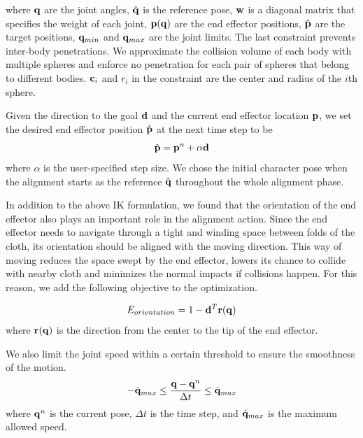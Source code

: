 where $\mathbf{q}$ are the joint angles, $\hat{\mathbf{q}}$ is the reference pose, $\mathbf{w}$ is a diagonal matrix that specifies the weight of each joint, $\mathbf{p}(\mathbf{q})$ are the end effector positions, $\hat{\mathbf{p}}$ are the target positions, $\mathbf{q}_{min}$ and $\mathbf{q}_{max}$ are the joint limits. The last constraint prevents inter-body penetrations. We approximate the collision volume of each body with multiple spheres and enforce no penetration for each pair of spheres that belong to different bodies. $\mathbf{c}_i$ and $r_i$ in the constraint are the center and radius of the $i$th sphere.

Given the direction to the goal $\mathbf{d}$ and the current end effector location $\mathbf{p}$, we set the desired end effector position $\hat{\mathbf{p}}$ at the next time step to be
\begin{equation}
  \hat{\mathbf{p}} = \mathbf{p}^n+\alpha\mathbf{d}
  \label{eq:target}
\end{equation}
where $\alpha$ is the user-specified step size.  We chose the initial character pose when the alignment starts as the reference $\hat{\mathbf{q}}$ throughout the whole alignment phase.

In addition to the above IK formulation, we found that the orientation of the end effector also plays an important role in the alignment action. Since the end effector needs to navigate through a tight and winding space between folds of the cloth, its orientation should be aligned with the moving direction. This way of moving reduces the space swept by the end effector, lowers its chance to collide with nearby cloth and minimizes the normal impacts if collisions happen. For this reason, we add the following objective to the optimization.

\begin{equation}
  E_{orientation} = 1-\mathbf{d}^T\mathbf{r(q})
  \label{eq:orientation}
\end{equation}
where $\mathbf{r(q)}$ is the direction from the center to the tip of the end effector.

We also limit the joint speed within a certain threshold to ensure the smoothness of the motion.
\begin{equation}
  -\dot{\mathbf{q}}_{max} \leq \frac{\mathbf{q} - \mathbf{q}^n}{\Delta t} \leq \dot{\mathbf{q}}_{max}
  \label{eq:speed}
\end{equation}
where $\mathbf{q}^n$ is the current pose, $\Delta t$ is the time step, and $\dot{\mathbf{q}}_{max}$ is the maximum allowed speed.

